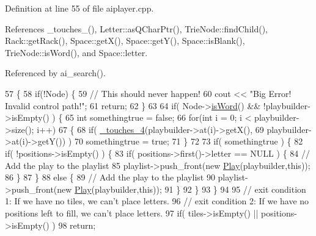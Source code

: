 Definition at line 55 of file aiplayer.\-cpp.



References \-\_\-touches\-\_(), Letter\-::as\-Q\-Char\-Ptr(), Trie\-Node\-::find\-Child(), Rack\-::get\-Rack(), Space\-::get\-X(), Space\-::get\-Y(), Space\-::is\-Blank(), Trie\-Node\-::is\-Word(), and Space\-::letter.



Referenced by ai\-\_\-search().


\begin{DoxyCode}
57                                                         \{
58     \textcolor{keywordflow}{if}(!Node) \{
59         \textcolor{comment}{// This should never happen!}
60         cout << \textcolor{stringliteral}{"Big Error! Invalid control path!"};
61         \textcolor{keywordflow}{return};
62     \}
63 
64     \textcolor{keywordflow}{if}( Node->\hyperlink{class_trie_node_a3fa48afcb9376feaf24c9d8acac7c076}{isWord}() && !playbuilder->isEmpty() ) \{
65         \textcolor{keywordtype}{int} somethingtrue = \textcolor{keyword}{false};
66         \textcolor{keywordflow}{for}(\textcolor{keywordtype}{int} i = 0; i < playbuilder->size(); i++)
67         \{
68             \textcolor{keywordflow}{if}( \hyperlink{class_a_i_player_a3bcac2df2a8f171dfedfa594855294af}{\_touches\_4}(playbuilder->at(i)->getX(),
69                            playbuilder->at(i)->getY()) )
70                 somethingtrue = \textcolor{keyword}{true};
71         \}
72 
73         \textcolor{keywordflow}{if}( somethingtrue ) \{
82             \textcolor{keywordflow}{if}( !positions->isEmpty() ) \{
83                 \textcolor{keywordflow}{if}( positions->first()->letter == NULL ) \{
84                     \textcolor{comment}{// Add the play to the playlist}
85                     playlist->push\_front(\textcolor{keyword}{new} \hyperlink{class_play}{Play}(playbuilder,\textcolor{keyword}{this}));
86                 \}
87             \}
88             \textcolor{keywordflow}{else} \{
89                 \textcolor{comment}{// Add the play to the playlist}
90                 playlist->push\_front(\textcolor{keyword}{new} \hyperlink{class_play}{Play}(playbuilder,\textcolor{keyword}{this}));
91             \}
92         \}
93     \}
94 
95     \textcolor{comment}{// exit condition 1: If we have no tiles, we can't place letters.}
96     \textcolor{comment}{// exit condition 2: If we have no positions left to fill, we can't place letters.}
97     \textcolor{keywordflow}{if}( tiles->isEmpty() || positions->isEmpty() )
98         \textcolor{keywordflow}{return};

\end{DoxyCode}
